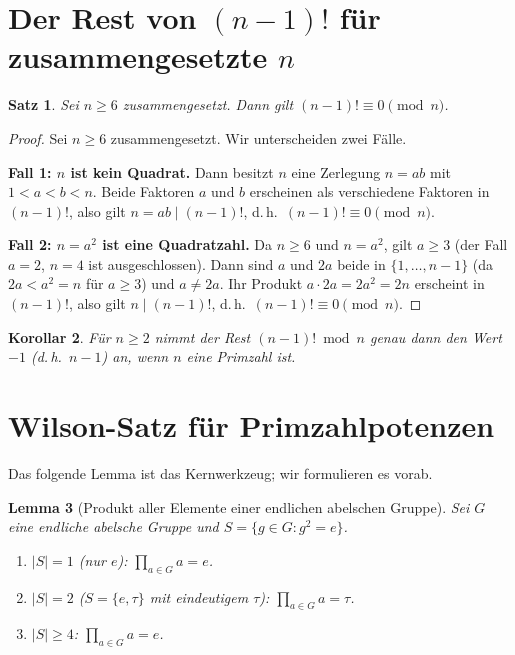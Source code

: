 \documentclass[12pt,a4paper]{amsart}
\newtheorem{theorem}{Satz}[section]
\newtheorem{lemma}[theorem]{Lemma}
\newtheorem{korollar}[theorem]{Korollar}
\theoremstyle{definition}
\begin{document}
\section{Der Rest von $(n-1)!$ für zusammengesetzte $n$}

\begin{theorem}\label{satz:zusammengesetzt}
  Sei $n \geq 6$ zusammengesetzt.  Dann gilt $(n-1)! \equiv 0 \pmod{n}$.
\end{theorem}

\begin{proof}
  Sei $n \geq 6$ zusammengesetzt.  Wir unterscheiden zwei Fälle.

  \textbf{Fall 1: $n$ ist kein Quadrat.}
  Dann besitzt $n$ eine Zerlegung $n = ab$ mit $1 < a < b < n$.
  Beide Faktoren $a$ und $b$ erscheinen als verschiedene Faktoren in $(n-1)!$,
  also gilt $n = ab \mid (n-1)!$, d.\,h.\ $(n-1)! \equiv 0 \pmod{n}$.

  \textbf{Fall 2: $n = a^2$ ist eine Quadratzahl.}
  Da $n \geq 6$ und $n = a^2$, gilt $a \geq 3$
  (der Fall $a = 2$, $n = 4$ ist ausgeschlossen).
  Dann sind $a$ und $2a$ beide in $\{1, \ldots, n-1\}$
  (da $2a < a^2 = n$ für $a \geq 3$) und $a \neq 2a$.
  Ihr Produkt $a \cdot 2a = 2a^2 = 2n$ erscheint in $(n-1)!$,
  also gilt $n \mid (n-1)!$, d.\,h.\ $(n-1)! \equiv 0 \pmod{n}$.
\end{proof}

\begin{korollar}
  Für $n \geq 2$ nimmt der Rest $(n-1)! \bmod n$ genau dann den Wert $-1$
  (d.\,h.\ $n-1$) an, wenn $n$ eine Primzahl ist.
\end{korollar}

\section{Wilson-Satz für Primzahlpotenzen}

Das folgende Lemma ist das Kernwerkzeug; wir formulieren es vorab.

\begin{lemma}[Produkt aller Elemente einer endlichen abelschen Gruppe]%
  \label{lem:produkt_abelsch}
  Sei $G$ eine endliche abelsche Gruppe und $S = \{g \in G : g^2 = e\}$.
  \begin{enumerate}
    \item[(a)] $|S| = 1$ (nur $e$): $\prod_{a \in G} a = e$.
    \item[(b)] $|S| = 2$ ($S = \{e, \tau\}$ mit eindeutigem $\tau$):
      $\prod_{a \in G} a = \tau$.
    \item[(c)] $|S| \geq 4$: $\prod_{a \in G} a = e$.
  \end{enumerate}
\end{lemma}
\end{document}
